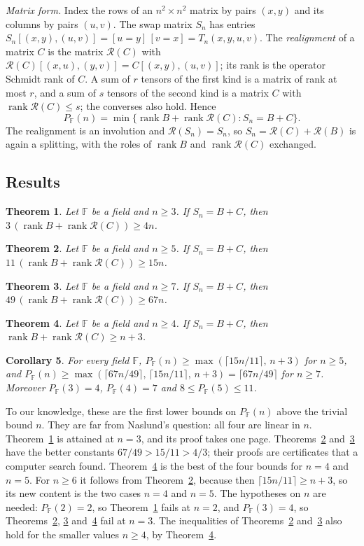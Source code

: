 \documentclass[11pt]{amsart}
\newtheorem{theorem}{Theorem}
\newtheorem{corollary}[theorem]{Corollary}
\theoremstyle{remark}
\newcommand{\F}{\mathbb{F}}
\newcommand{\rk}{\operatorname{rank}}
\newcommand{\R}{\mathcal{R}}
\begin{document}
\emph{Matrix form.} Index the rows of an $n^2\times n^2$ matrix by pairs $(x,y)$ and its columns by pairs
$(u,v)$. The swap matrix $S_n$ has entries $S_n[(x,y),(u,v)]=[u=y]\,[v=x]=T_n(x,y,u,v)$. The
\emph{realignment} of a matrix $C$ is the matrix $\R(C)$ with $\R(C)[(x,u),(y,v)]=C[(x,y),(u,v)]$; its rank
is the operator Schmidt rank of $C$. A sum of $r$ tensors of the first kind is a matrix of rank at most $r$,
and a sum of $s$ tensors of the second kind is a matrix $C$ with $\rk\R(C)\le s$; the converses also hold.
Hence
\[
  P_\F(n)=\min\{\rk B+\rk\R(C) : S_n=B+C\}.
\]
The realignment is an involution and $\R(S_n)=S_n$, so $S_n=\R(C)+\R(B)$ is again a splitting, with the roles
of $\rk B$ and $\rk\R(C)$ exchanged.

\subsection*{Results}

\begin{theorem}\label{thm:43}
Let $\F$ be a field and $n\ge3$. If $S_n=B+C$, then $3\,(\rk B+\rk\R(C))\ge4n$.
\end{theorem}

\begin{theorem}\label{thm:1511}
Let $\F$ be a field and $n\ge5$. If $S_n=B+C$, then $11\,(\rk B+\rk\R(C))\ge15n$.
\end{theorem}

\begin{theorem}\label{thm:6749}
Let $\F$ be a field and $n\ge7$. If $S_n=B+C$, then $49\,(\rk B+\rk\R(C))\ge67n$.
\end{theorem}

\begin{theorem}\label{thm:n3}
Let $\F$ be a field and $n\ge4$. If $S_n=B+C$, then $\rk B+\rk\R(C)\ge n+3$.
\end{theorem}

\begin{corollary}\label{cor:values}
For every field $\F$, $P_\F(n)\ge\max(\lceil 15n/11\rceil,\,n+3)$ for $n\ge5$, and
$P_\F(n)\ge\max(\lceil 67n/49\rceil,\,\lceil 15n/11\rceil,\,n+3)=\lceil 67n/49\rceil$ for $n\ge7$. Moreover $P_\F(3)=4$,
$P_\F(4)=7$ and $8\le P_\F(5)\le11$.
\end{corollary}

To our knowledge, these are the first lower bounds on $P_\F(n)$ above the trivial bound $n$. They are far
from Naslund's question: all four are linear in $n$. Theorem~\ref{thm:43} is attained at $n=3$, and its
proof takes one page. Theorems~\ref{thm:1511} and~\ref{thm:6749} have the better constants
$67/49>15/11>4/3$; their proofs are certificates that a computer search found. Theorem~\ref{thm:n3} is the
best of the four bounds for $n=4$ and $n=5$. For $n\ge6$ it follows from Theorem~\ref{thm:1511}, because
then $\lceil15n/11\rceil\ge n+3$, so its new content is the two cases $n=4$ and $n=5$. The hypotheses on $n$
are needed: $P_\F(2)=2$, so Theorem~\ref{thm:43} fails at $n=2$, and $P_\F(3)=4$, so
Theorems~\ref{thm:1511}, \ref{thm:6749} and~\ref{thm:n3} fail at $n=3$. The inequalities of
Theorems~\ref{thm:1511} and~\ref{thm:6749} also hold for the smaller values $n\ge4$, by
Theorem~\ref{thm:n3}.
\end{document}
